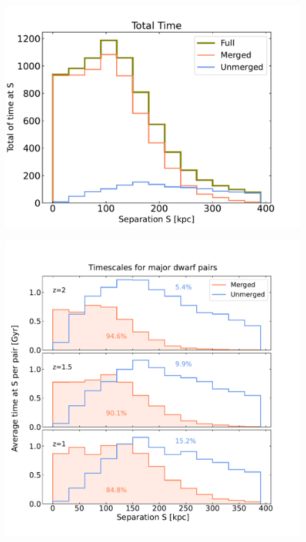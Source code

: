 \documentclass[twocolumn]{aastex631}
\begin{document}
\begin{figure}[htb]
    \centering
    \includegraphics[width=\columnwidth]{plots/3_timescale-analysis/fullsamples.pdf}
    \caption{}
\end{figure}

\begin{figure}[htb]
    \centering
    \includegraphics[width=\columnwidth]{plots/4_timescales/timevssep_z.pdf}
    \caption{}
\end{figure}
\end{document}
